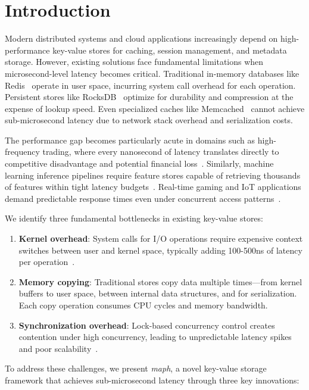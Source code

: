 \documentclass[10pt,conference]{IEEEtran}
\begin{document}
\section{Introduction}

Modern distributed systems and cloud applications increasingly depend on high-performance key-value stores for caching, session management, and metadata storage. However, existing solutions face fundamental limitations when microsecond-level latency becomes critical. Traditional in-memory databases like Redis~\cite{redis} operate in user space, incurring system call overhead for each operation. Persistent stores like RocksDB~\cite{rocksdb} optimize for durability and compression at the expense of lookup speed. Even specialized caches like Memcached~\cite{memcached} cannot achieve sub-microsecond latency due to network stack overhead and serialization costs.

The performance gap becomes particularly acute in domains such as high-frequency trading, where every nanosecond of latency translates directly to competitive disadvantage and potential financial loss~\cite{hft-latency}. Similarly, machine learning inference pipelines require feature stores capable of retrieving thousands of features within tight latency budgets~\cite{ml-serving}. Real-time gaming and IoT applications demand predictable response times even under concurrent access patterns~\cite{gaming-latency}.

We identify three fundamental bottlenecks in existing key-value stores:

\begin{enumerate}
\item \textbf{Kernel overhead}: System calls for I/O operations require expensive context switches between user and kernel space, typically adding 100-500ns of latency per operation~\cite{syscall-overhead}.

\item \textbf{Memory copying}: Traditional stores copy data multiple times—from kernel buffers to user space, between internal data structures, and for serialization. Each copy operation consumes CPU cycles and memory bandwidth.

\item \textbf{Synchronization overhead}: Lock-based concurrency control creates contention under high concurrency, leading to unpredictable latency spikes and poor scalability~\cite{lock-contention}.
\end{enumerate}

To address these challenges, we present \textit{maph}, a novel key-value storage framework that achieves sub-microsecond latency through three key innovations:
\end{document}
